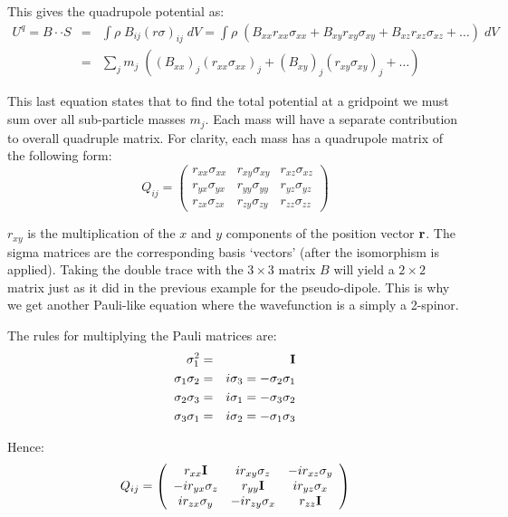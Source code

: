 \noindent This gives the quadrupole potential as:
\begin{eqnarray}
U^q = B\cdot\cdot S &=& \int \rho\; B_{ij} (r \sigma)_{ij} \;dV = \int \rho\; (B_{xx} r_{xx}\sigma_{xx} + B_{xy} r_{xy}\sigma_{xy} + B_{xz} r_{xz}\sigma_{xz} + \ldots) \;dV \nonumber \\
&=& \sum_j m_j \; ( (B_{xx})_j (r_{xx}\sigma_{xx})_j + (B_{xy})_j (r_{xy}\sigma_{xy})_j + \ldots)
\end{eqnarray}

\noindent This last equation states that to find the total potential at a gridpoint we must sum over all sub-particle masses $m_j$. Each mass will have a separate contribution to overall quadruple matrix. For clarity, each mass has a quadrupole matrix of the following form:
\begin{equation}
Q_{ij} =
\left(\begin{array}{ccc}
r_{xx}\sigma_{xx} & r_{xy}\sigma_{xy} & r_{xz}\sigma_{xz} \\
r_{yx}\sigma_{yx} & r_{yy}\sigma_{yy} & r_{yz}\sigma_{yz} \\
r_{zx}\sigma_{zx} & r_{zy}\sigma_{zy} & r_{zz}\sigma_{zz}
\end{array}\right)
\end{equation}

\noindent $r_{xy}$ is the multiplication of the $x$ and $y$ components of the position vector ${\bf r}$. The sigma matrices are the corresponding basis `vectors' (after the isomorphism is applied). Taking the double trace with the $3 \times 3$ matrix $B$ will yield a $2 \times 2$ matrix just as it did in the previous example for the pseudo-dipole. This is why we get another Pauli-like equation where the wavefunction is a simply a 2-spinor.

The rules for multiplying the Pauli matrices \citep{bib_lou} are:
\begin{eqnarray}
\sigma_1^2 &=& {\bf I} \\
\sigma_1\sigma_2 &=& i\sigma_3 = -\sigma_2\sigma_1 \\
\sigma_2\sigma_3 &=& i\sigma_1 = -\sigma_3\sigma_2 \\
\sigma_3\sigma_1 &=& i\sigma_2 = -\sigma_1\sigma_3
\end{eqnarray}

\noindent Hence:
\begin{equation}
Q_{ij} = 
\left(\begin{array}{ccc}
r_{xx} {\bf I} & i r_{xy}\sigma_{z} & -i r_{xz}\sigma_{y} \\
-i r_{yx}\sigma_{z} & r_{yy} {\bf I} & i r_{yz}\sigma_{x} \\
i r_{zx}\sigma_{y} & -i r_{zy}\sigma_{x} & r_{zz} {\bf I}
\end{array}\right)
\end{equation}

